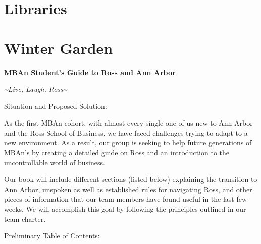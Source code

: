 \documentclass[
]{book}
\begin{document}
\hypertarget{libraries}{%
\section{Libraries}\label{libraries}}

\hypertarget{winter-garden}{%
\section{Winter Garden}\label{winter-garden}}

\textbf{MBAn Student's Guide to Ross and Ann Arbor}

\emph{\textasciitilde Live, Laugh, Ross\textasciitilde{}}

Situation and Proposed Solution:

As the first MBAn cohort, with almost every single one of us new to Ann Arbor and the Ross School of Business, we have faced challenges trying to adapt to a new environment. As a result, our group is seeking to help future generations of MBAn's by creating a detailed guide on Ross and an introduction to the uncontrollable world of business.

Our book will include different sections (listed below) explaining the transition to Ann Arbor, unspoken as well as established rules for navigating Ross, and other pieces of information that our team members have found useful in the last few weeks. We will accomplish this goal by following the principles outlined in our team charter.

Preliminary Table of Contents:
\end{document}
